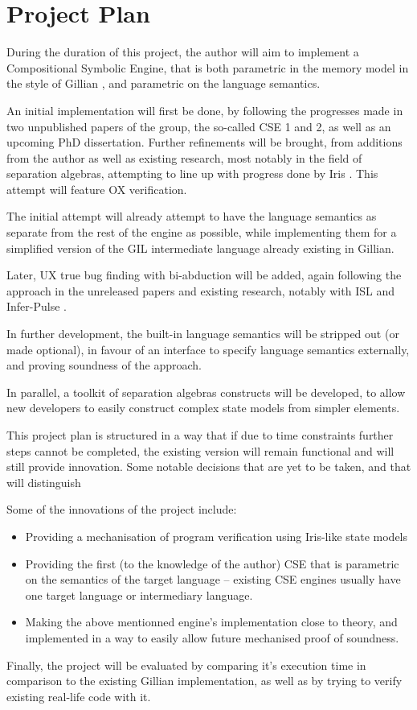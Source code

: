 \chapter{Project Plan}

During the duration of this project, the author will aim to implement a Compositional Symbolic Engine, that is both parametric in the memory model in the style of Gillian \cite{gillian0, gillian1, gillian2}, and parametric on the language semantics.

An initial implementation will first be done, by following the progresses made in two unpublished papers of the group, the so-called CSE 1 \cite{cse1} and 2, as well as an upcoming PhD dissertation. Further refinements will be brought, from additions from the author as well as existing research, most notably in the field of separation algebras, attempting to line up with progress done by Iris \cite{iris}. This attempt will feature OX verification.

The initial attempt will already attempt to have the language semantics as separate from the rest of the engine as possible, while implementing them for a simplified version of the GIL intermediate language already existing in Gillian.

Later, UX true bug finding with bi-abduction will be added, again following the approach in the unreleased papers and existing research, notably with ISL \cite{isl} and Infer-Pulse \cite{pulse}.

In further development, the built-in language semantics will be stripped out (or made optional), in favour of an interface to specify language semantics externally, and proving soundness of the approach. 

In parallel, a toolkit of separation algebras constructs will be developed, to allow new developers to easily construct complex state models from simpler elements.

This project plan is structured in a way that if due to time constraints further steps cannot be completed, the existing version will remain functional and will still provide innovation. Some notable decisions that are yet to be taken, and that will distinguish

Some of the innovations of the project include: \begin{itemize}
	\item Providing a mechanisation of program verification using Iris-like state models
	\item Providing the first (to the knowledge of the author) CSE that is parametric on the semantics of the target language -- existing CSE engines usually have one target language or intermediary language.
	\item Making the above mentionned engine's implementation close to theory, and implemented in a way to easily allow future mechanised proof of soundness.
\end{itemize}

Finally, the project will be evaluated by comparing it's execution time in comparison to the existing Gillian implementation, as well as by trying to verify existing real-life code with it.